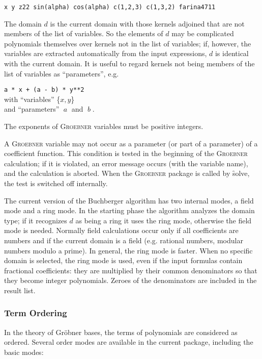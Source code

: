 {\small
\begin{verbatim}
x y z22 sin(alpha) cos(alpha) c(1,2,3) c(1,3,2) farina4711
\end{verbatim}
}

The domain $d$ is the current \REDUCE domain with those kernels
adjoined that are not members of the list of variables. So the
elements of $d$ may be complicated polynomials themselves over
kernels not in the list of variables; if, however, the variables are
extracted automatically from the input expressions, $d$ is identical
with the current \REDUCE domain. It is useful to regard kernels not
being members of the list of variables as ``parameters'', e.g.
\begin{center}
  \texttt{a * x + (a - b) * y**2} \\
  with ``variables'' \{$x,y$\} \\
  and ``parameters'' $\;a\;$ and $\;b\;$.
\end{center}

The exponents of \textsc{Groebner} variables must be positive integers.

A \textsc{Groebner} variable may not occur as a parameter (or part
of a parameter) of a coefficient function. This condition is
tested in the beginning of the \textsc{Groebner} calculation; if it is
violated, an error message occurs (with the variable name), and the
calculation is aborted. When the \textsc{Groebner} package is called by
\f{solve}, the test is switched off internally.

The current version of the Buchberger algorithm has two internal
modes, a field mode and a ring mode. In the starting phase the
algorithm analyzes the domain type; if it recognizes $d$ as being a
ring it uses the ring mode, otherwise the field mode is needed.
Normally field calculations occur only if all coefficients are numbers
and if the current \REDUCE domain is a field (e.g. rational numbers,
modular numbers modulo a prime). In general, the ring mode is faster.
When no specific
\REDUCE domain is selected, the ring mode is used, even if the input
formulas contain fractional coefficients: they are multiplied by their
common denominators so that they become integer polynomials. Zeroes of the
denominators are included in the result list.

\subsubsection{Term Ordering}
\par
In the theory of Gr\"obner bases, the terms of polynomials are
considered as ordered. Several order modes are available in
the current package, including the basic modes:

